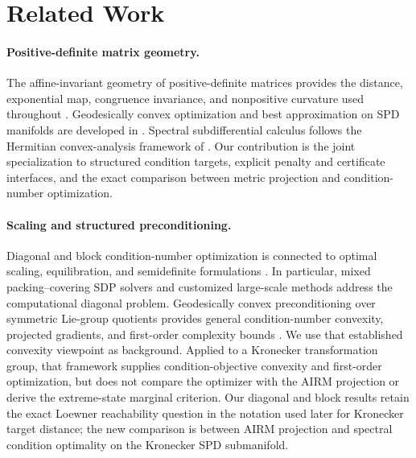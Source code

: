 \section{Related Work}
\label{sec:related}

\paragraph{Positive-definite matrix geometry.}
The affine-invariant geometry of positive-definite matrices provides the
distance, exponential map, congruence invariance, and nonpositive curvature
used throughout
\cite{bhatia2007positive,pennec2006riemannian,higham2008functions}.
Geodesically convex optimization and best approximation on SPD manifolds are
developed in
\cite{sra2015conic,lim2004best,bacak2014convex,tumpach2024totally}.
Spectral subdifferential calculus follows the Hermitian convex-analysis
framework of \cite{lewis1996convex}.  Our contribution is the joint
specialization to structured condition targets, explicit penalty and
certificate interfaces, and the exact comparison between metric projection
and condition-number optimization.

\paragraph{Scaling and structured preconditioning.}
Diagonal and block condition-number optimization is connected to optimal
scaling, equilibration, and semidefinite formulations
\cite{bauer1963optimally,vandersluis1969equilibration,
shapiro1982optimally,shapiro1985block,marechal2009optimizing,
lu2011minimizing,jambulapati2020fast,qu2024optimal,gao2023scalable,
ghadimi2025omega}.
In particular, mixed packing--covering SDP solvers and customized large-scale
methods address the computational diagonal problem.  Geodesically convex
preconditioning over symmetric Lie-group quotients provides general
condition-number convexity, projected gradients, and first-order complexity
bounds \cite{dogan2025geodesicpreconditioning}.  We use that established
convexity viewpoint as background.  Applied to a Kronecker transformation
group, that framework supplies condition-objective convexity and first-order
optimization, but does not compare the optimizer with the AIRM projection or
derive the extreme-state marginal criterion.  Our diagonal and block results retain the
exact Loewner reachability question in the notation used later for Kronecker
target distance; the new comparison is between AIRM projection and spectral
condition optimality on the Kronecker SPD submanifold.

